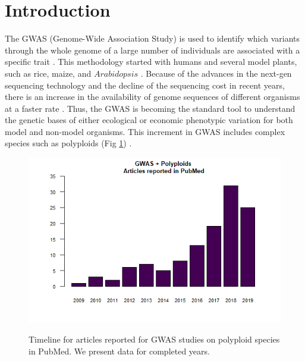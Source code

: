 \documentclass{article}
\begin{document}
\section{Introduction}


The GWAS (Genome-Wide Association Study) is used to identify which variants through the whole genome of a large number of individuals are associated with a specific trait \cite{cantor2010prioritizing, begum2012comprehensive}. This methodology started with humans and several model plants, such as rice, maize, and $Arabidopsis$ \cite{lauc2010genomics, tian2011genome, cao2011whole, korte2013advantages, han2013sequencing}. Because of the advances in the next-gen sequencing technology and the decline of the sequencing cost in recent years, there is an increase in the availability of genome sequences of different organisms at a faster rate \cite{ekblom2011applications, ellegren2014genome}. Thus, the GWAS is becoming the standard tool to understand the genetic bases of either ecological or economic phenotypic variation for both model and non-model organisms. This increment in GWAS includes complex species such as polyploids (Fig \ref{GWASpolyploids}) \cite{ekblom2011applications, santure2018wild}. 

\begin{figure}
\begin{center}
    
\includegraphics[width=12cm]{images/GWASpolyploids.png}
\label{GWASpolyploids}
\caption{Timeline for articles reported for GWAS studies on polyploid species in PubMed. We present data for completed years.}
\end{center}

\end{figure}
\end{document}
